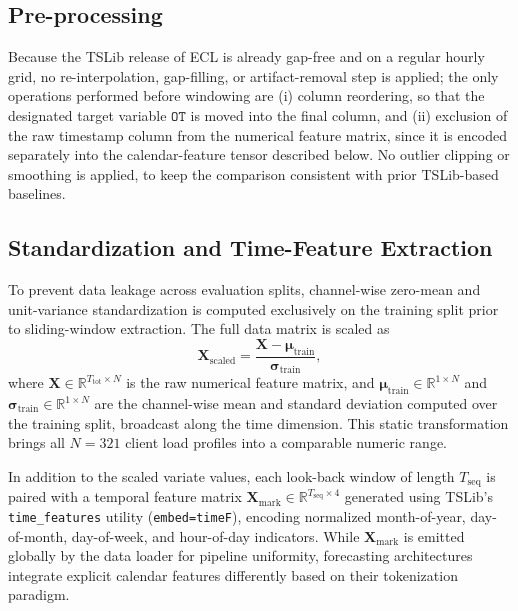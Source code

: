 \documentclass[10pt,journal]{IEEEtran}
\begin{document}
\subsection{Pre-processing}
Because the TSLib release of ECL is already gap-free and on a regular hourly grid, no re-interpolation, gap-filling, or artifact-removal step is applied; the only operations performed before windowing are (i) column reordering, so that the designated target variable $\mathtt{OT}$ is moved into the final column, and (ii) exclusion of the raw timestamp column from the numerical feature matrix, since it is encoded separately into the calendar-feature tensor described below. No outlier clipping or smoothing is applied, to keep the comparison consistent with prior TSLib-based baselines.

\subsection{Standardization and Time-Feature Extraction}
To prevent data leakage across evaluation splits, channel-wise zero-mean and unit-variance standardization is computed exclusively on the training split prior to sliding-window extraction. The full data matrix is scaled as
\begin{equation}
\label{eq:standardization}
\bm{X}_{\mathrm{scaled}} = \frac{\bm{X} - \bm{\mu}_{\mathrm{train}}}{\bm{\sigma}_{\mathrm{train}}},
\end{equation}
where $\bm{X} \in \mathbb{R}^{T_{\mathrm{tot}} \times N}$ is the raw numerical feature matrix, and $\bm{\mu}_{\mathrm{train}} \in \mathbb{R}^{1 \times N}$ and $\bm{\sigma}_{\mathrm{train}} \in \mathbb{R}^{1 \times N}$ are the channel-wise mean and standard deviation computed over the training split, broadcast along the time dimension. This static transformation brings all $N = 321$ client load profiles into a comparable numeric range.

In addition to the scaled variate values, each look-back window of length $T_{\mathrm{seq}}$ is paired with a temporal feature matrix $\bm{X}_{\mathrm{mark}} \in \mathbb{R}^{T_{\mathrm{seq}} \times 4}$ generated using TSLib's \texttt{time\_features} utility (\texttt{embed=timeF}), encoding normalized month-of-year, day-of-month, day-of-week, and hour-of-day indicators. While $\bm{X}_{\mathrm{mark}}$ is emitted globally by the data loader for pipeline uniformity, forecasting architectures integrate explicit calendar features differently based on their tokenization paradigm.
\end{document}
